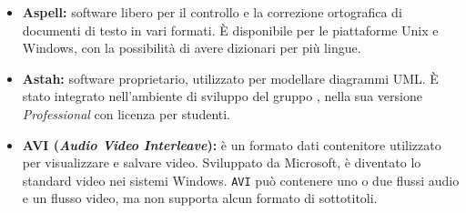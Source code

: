 \begin{itemize}
\item\textbf{Aspell:} software libero per il controllo e la correzione ortografica di documenti di testo in vari formati. È disponibile per le piattaforme Unix e Windows\glossario{}, con la possibilità di avere dizionari per più lingue.

\item\textbf{Astah:} software proprietario, utilizzato per modellare diagrammi UML\glossario{}. \`E stato integrato nell'ambiente di sviluppo del gruppo \authorName, nella sua versione \textit{Professional} con licenza per studenti.

\item\textbf{AVI (\textit{Audio Video Interleave}):} è un formato dati contenitore utilizzato per visualizzare e salvare video. Sviluppato da Microsoft, è diventato lo standard video nei sistemi Windows\glossario{}. \verb!AVI! può contenere uno o due flussi audio e un flusso video, ma non supporta alcun formato di sottotitoli.
\end{itemize}
\pagebreak

